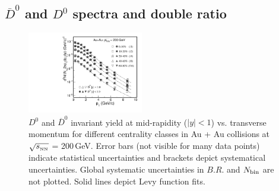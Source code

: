 \documentclass[%
 reprint,	
 amsmath,amssymb,
 aps,
 prc,
]{revtex4-1}
\begin{document}

\subsection{\label{result:D0barD0ratio} $\overline{D}^{0}$ and $D^{0}$ spectra and double ratio}

\begin{figure}
\centering
\includegraphics[width=0.45\textwidth]{fig/D0_spectra_bothposneg.pdf}
\caption{$D^{0}$ and $\overline{D}^{0}$ invariant yield at mid-rapidity ($|y|<1$) vs. transverse momentum for different centrality classes in Au + Au collisions at $\sqrt{s_{_{\rm NN}}}$ = 200\,GeV. Error bars (not visible for many data points) indicate statistical uncertainties and brackets depict systematical uncertainties. Global systematic uncertainties in $B.R.$ and $N_{\rm bin}$ are not plotted. Solid lines depict Levy function fits.}
\label{fig:D0_spectra_bothposneg} 
\end{figure}
\end{document}

